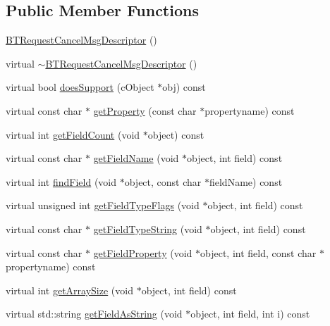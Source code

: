 \subsection*{Public Member Functions}
\begin{DoxyCompactItemize}
\item 
\hyperlink{classBTRequestCancelMsgDescriptor_a7121a1529ca6e29776cd6727889a177f}{B\+T\+Request\+Cancel\+Msg\+Descriptor} ()
\item 
virtual \hyperlink{classBTRequestCancelMsgDescriptor_a443e8739e46cd86bcb238c6f0d3b6256}{$\sim$\+B\+T\+Request\+Cancel\+Msg\+Descriptor} ()
\item 
virtual bool \hyperlink{classBTRequestCancelMsgDescriptor_a8ce8da495d3baf79d445061a9f88f4b9}{does\+Support} (c\+Object $\ast$obj) const 
\item 
virtual const char $\ast$ \hyperlink{classBTRequestCancelMsgDescriptor_a6fd345e4449fc27cc056c8ab009db4cf}{get\+Property} (const char $\ast$propertyname) const 
\item 
virtual int \hyperlink{classBTRequestCancelMsgDescriptor_af1ef3838ebf23aa5915624d0d48d3041}{get\+Field\+Count} (void $\ast$object) const 
\item 
virtual const char $\ast$ \hyperlink{classBTRequestCancelMsgDescriptor_a840113113837534733d2671b0ffe44d2}{get\+Field\+Name} (void $\ast$object, int field) const 
\item 
virtual int \hyperlink{classBTRequestCancelMsgDescriptor_a90c03404cd1373dd0782c2eed2dc89c8}{find\+Field} (void $\ast$object, const char $\ast$field\+Name) const 
\item 
virtual unsigned int \hyperlink{classBTRequestCancelMsgDescriptor_a87c421426ac968920409bd79693c1fdd}{get\+Field\+Type\+Flags} (void $\ast$object, int field) const 
\item 
virtual const char $\ast$ \hyperlink{classBTRequestCancelMsgDescriptor_afe0ecf5784029929a18ee58a4da78c67}{get\+Field\+Type\+String} (void $\ast$object, int field) const 
\item 
virtual const char $\ast$ \hyperlink{classBTRequestCancelMsgDescriptor_a621b6ebc8169c9ad9a3cc53d783152d5}{get\+Field\+Property} (void $\ast$object, int field, const char $\ast$propertyname) const 
\item 
virtual int \hyperlink{classBTRequestCancelMsgDescriptor_a2adab05184edbec1935786a73bec3fa6}{get\+Array\+Size} (void $\ast$object, int field) const 
\item 
virtual std\+::string \hyperlink{classBTRequestCancelMsgDescriptor_a37a35440136025afb9ef3c5ef8b0617d}{get\+Field\+As\+String} (void $\ast$object, int field, int i) const 

\end{DoxyCompactItemize}

